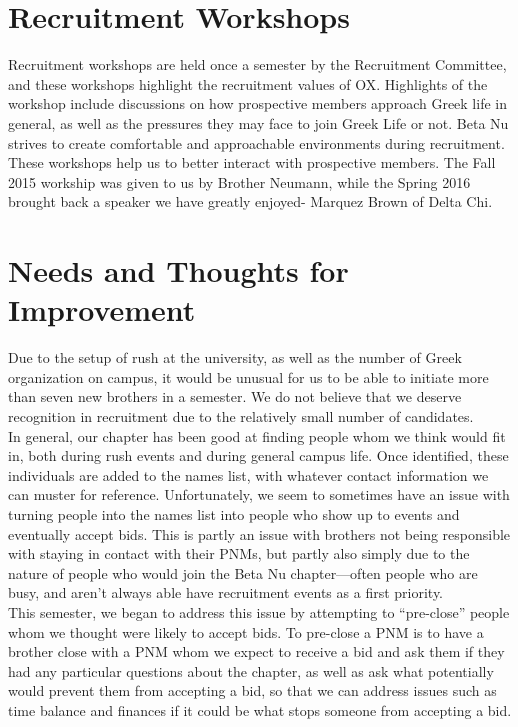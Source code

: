   \section*{Recruitment Workshops}
    Recruitment workshops are held once a semester by the Recruitment Committee, and these workshops highlight the recruitment values of OX. Highlights of the workshop include discussions on how prospective members approach Greek life in general, as well as the pressures they may face to join Greek Life or not. Beta Nu strives to create comfortable and approachable environments during recruitment. These workshops help us to better interact with prospective members. The Fall 2015 workship was given to us by Brother Neumann, while the Spring 2016 brought back a speaker we have greatly enjoyed- Marquez Brown of Delta Chi.

    
  \section*{Needs and Thoughts for Improvement}
    Due to the setup of rush at the university, as well as the number of Greek organization on campus, it would be unusual for us to be able to initiate more than seven new brothers in a semester. We do not believe that we deserve recognition in recruitment due to the relatively small number of candidates. \\
    
    In general, our chapter has been good at finding people whom we think would fit in, both during rush events and during general campus life. Once identified, these individuals are added to the names list, with whatever contact information we can muster for reference. Unfortunately, we seem to sometimes have an issue with turning people into the names list into people who show up to events and eventually accept bids. This is partly an issue with brothers not being responsible with staying in contact with their PNMs, but partly also simply due to the nature of people who would join the Beta Nu chapter—often people who are busy, and aren’t always able have recruitment events as a first priority. \\
    
    This semester, we began to address this issue by attempting to “pre-close” people whom we thought were likely to accept bids. To pre-close a PNM is to have a brother close with a PNM whom we expect to receive a bid and ask them if they had any particular questions about the chapter, as well as ask what potentially would prevent them from accepting a bid, so that we can address issues such as time balance and finances if it could be what stops someone from accepting a bid. \\
    
